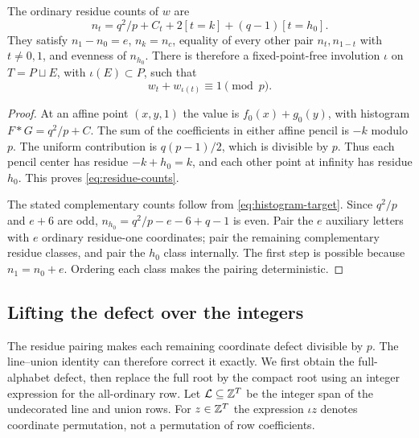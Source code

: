 \begin{lemma}\label{lem:residue}
The ordinary residue counts of $w$ are
\begin{equation}\label{eq:residue-counts}
 n_t=q^2/p+C_t+2[t=k]+(q-1)[t=h_0].
\end{equation}
They satisfy $n_1-n_0=e$, $n_k=n_c$, equality of every other pair $n_t,n_{1-t}$ with $t\ne0,1$, and evenness of $n_{h_0}$. There is therefore a fixed-point-free involution $\iota$ on $T=P\sqcup E$, with $\iota(E)\subset P$, such that
\begin{equation}\label{eq:residue-pair}
 w_t+w_{\iota(t)}\equiv1\pmod p.
\end{equation}
\end{lemma}
\begin{proof}
At an affine point $(x,y,1)$ the value is $f_0(x)+g_0(y)$, with histogram $F*G=q^2/p+C$. The sum of the coefficients in either affine pencil is $-k$ modulo $p$. The uniform contribution is $q(p-1)/2$, which is divisible by $p$. Thus each pencil center has residue $-k+h_0=k$, and each other point at infinity has residue $h_0$. This proves \eqref{eq:residue-counts}.

The stated complementary counts follow from \eqref{eq:histogram-target}. Since $q^2/p$ and $e+6$ are odd, $n_{h_0}=q^2/p-e-6+q-1$ is even. Pair the $e$ auxiliary letters with $e$ ordinary residue-one coordinates; pair the remaining complementary residue classes, and pair the $h_0$ class internally. The first step is possible because $n_1=n_0+e$. Ordering each class makes the pairing deterministic.
\end{proof}

\subsection{Lifting the defect over the integers}

The residue pairing makes each remaining coordinate defect divisible by $p$. The line--union identity can therefore correct it exactly. We first obtain the full-alphabet defect, then replace the full root by the compact root using an integer expression for the all-ordinary row.
Let $\mathcal L\subseteq\mathbb Z^T$ be the integer span of the undecorated line and union rows. For $z\in\mathbb Z^T$ the expression $\iota z$ denotes coordinate permutation, not a permutation of row coefficients.

